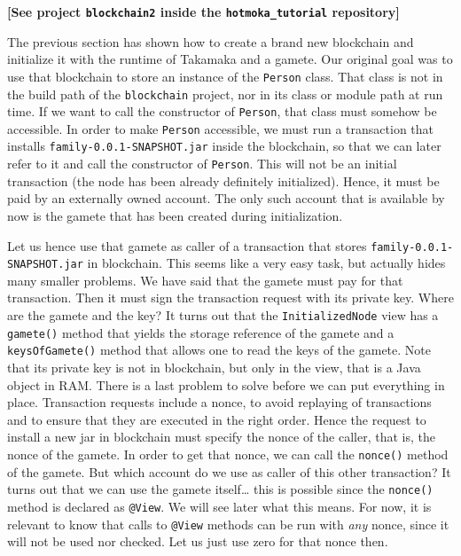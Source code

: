 \documentclass[a4paper,]{book}
\begin{document}
{\textbf{{[}See project \texttt{blockchain2} inside the
\texttt{hotmoka\_tutorial} repository{]}}

The previous section has shown how to create a brand new blockchain and
initialize it with the runtime of Takamaka and a gamete. Our original
goal was to use that blockchain to store an instance of the
\texttt{Person} class. That class is not in the build path of the
\texttt{blockchain} project, nor in its class or module path at run
time. If we want to call the constructor of \texttt{Person}, that class
must somehow be accessible. In order to make \texttt{Person} accessible,
we must run a transaction that installs
\texttt{family-0.0.1-SNAPSHOT.jar} inside the blockchain, so that we can
later refer to it and call the constructor of \texttt{Person}. This will
not be an initial transaction (the node has been already definitely
initialized). Hence, it must be paid by an externally owned account. The
only such account that is available by now is the gamete that has been
created during initialization.

Let us hence use that gamete as caller of a transaction that stores
\texttt{family-0.0.1-SNAPSHOT.jar} in blockchain. This seems like a very
easy task, but actually hides many smaller problems. We have said that
the gamete must pay for that transaction. Then it must sign the
transaction request with its private key. Where are the gamete and the
key? It turns out that the \texttt{InitializedNode} view has a
\texttt{gamete()} method that yields the storage reference of the gamete
and a \texttt{keysOfGamete()} method that allows one to read the keys of
the gamete. Note that its private key is not in blockchain, but only in
the view, that is a Java object in RAM. There is a last problem to solve
before we can put everything in place. Transaction requests include a
nonce, to avoid replaying of transactions and to ensure that they are
executed in the right order. Hence the request to install a new jar in
blockchain must specify the nonce of the caller, that is, the nonce of
the gamete. In order to get that nonce, we can call the \texttt{nonce()}
method of the gamete. But which account do we use as caller of this
other transaction? It turns out that we can use the gamete
itself\ldots{} this is possible since the \texttt{nonce()} method is
declared as \texttt{@View}. We will see later what this means. For now,
it is relevant to know that calls to \texttt{@View} methods can be run
with \emph{any} nonce, since it will not be used nor checked. Let us
just use zero for that nonce then.

}
\end{document}

